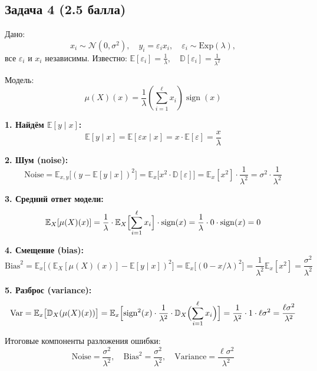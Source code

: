 \documentclass[a4paper,12pt]{article}
\begin{document}
\newpage

\subsection*{Задача 4 (2.5 балла)}

Дано:
\[
x_i \sim \mathcal{N}(0, \sigma^2), \quad y_i = \varepsilon_i x_i, \quad \varepsilon_i \sim \text{Exp}(\lambda),
\]
все \(\varepsilon_i\) и \(x_i\) независимы.
Известно: \(\mathbb{E}[\varepsilon_i] = \frac{1}{\lambda},\quad \mathbb{D}[\varepsilon_i] = \frac{1}{\lambda^2}\)

Модель:
\[
\mu(X)(x) = \frac{1}{\lambda} \left( \sum_{i=1}^{\ell} x_i \right) \operatorname{sign}(x)
\]

\bigskip

\textbf{1. Найдём \(\mathbb{E}[y \mid x]\):}
\[
\mathbb{E}[y \mid x] = \mathbb{E}[\varepsilon x \mid x] = x \cdot \mathbb{E}[\varepsilon] = \frac{x}{\lambda}
\]

\bigskip

\textbf{2. Шум (noise):}
\[
\text{Noise} = \mathbb{E}_{x,y}\bigl[(y - \mathbb{E}[y \mid x])^2\bigr] = \mathbb{E}_x\bigl[x^2 \cdot \mathbb{D}[\varepsilon]\bigr] = \mathbb{E}_x[x^2] \cdot \frac{1}{\lambda^2} = \sigma^2 \cdot \frac{1}{\lambda^2}
\]

\bigskip

\textbf{3. Средний ответ модели:}
\[
\mathbb{E}_X[\mu(X)(x)] = \frac{1}{\lambda} \cdot \mathbb{E}_X\Bigl[\sum_{i=1}^{\ell} x_i\Bigr] \cdot \operatorname{sign}(x) = \frac{1}{\lambda} \cdot 0 \cdot \operatorname{sign}(x) = 0
\]

\bigskip

\textbf{4. Смещение (bias):}
\[
\text{Bias}^2 = \mathbb{E}_x\bigl[(\mathbb{E}_X[\mu(X)(x)] - \mathbb{E}[y \mid x])^2\bigr] = \mathbb{E}_x\bigl[(0 - x/\lambda)^2\bigr] = \frac{1}{\lambda^2} \mathbb{E}_x[x^2] = \frac{\sigma^2}{\lambda^2}
\]

\bigskip

\textbf{5. Разброс (variance):}
\[
\text{Var} = \mathbb{E}_x\bigl[\mathbb{D}_X(\mu(X)(x))\bigr] = \mathbb{E}_x\Bigl[\operatorname{sign}^2(x) \cdot \frac{1}{\lambda^2} \cdot \mathbb{D}_X\Bigl(\sum_{i=1}^{\ell} x_i\Bigr)\Bigr] = \frac{1}{\lambda^2} \cdot 1 \cdot \ell \sigma^2 = \frac{\ell \sigma^2}{\lambda^2}
\]

\bigskip

Итоговые компоненты разложения ошибки:
\[
\boxed{\text{Noise} = \frac{\sigma^2}{\lambda^2}, \quad \text{Bias}^2 = \frac{\sigma^2}{\lambda^2}, \quad \text{Variance} = \frac{\ell \sigma^2}{\lambda^2}}
\]
\end{document}

